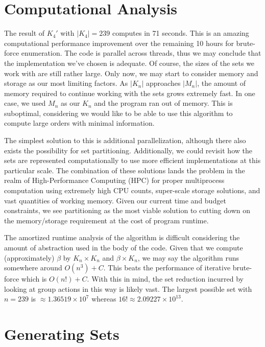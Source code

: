 \documentclass[12pt]{report}
\begin{document}
\section{Computational Analysis}

\par The result of ${K_4}\prime$ with $\left|K_4\right|=239$ computes
in 71 seconds. This is an amazing computational performance improvement over the remaining 10 hours for
brute-force enumeration. The code is parallel across threads, thus we may conclude that the
implementation we've chosen is adequate. Of course, the sizes of the sets we work with are still
rather large. Only now, we may start to consider memory and storage as our most limiting factors. As
$\left|K_n\right|$ approaches $\left|M_n\right|$, the amount of memory required to continue working
with the sets grows extremely fast. In one case, we used $M_n$ as our $K_n$ and the program ran out
of memory. This is suboptimal, considering we would like to be able to use this algorithm to compute large orders with minimal information.

\par The simplest solution to this is additional parallelization, although there also exists the
possibility for set partitioning. Additionally, we could revisit how the sets are represented
computationally to use more efficient implementations at this particular scale.
The combination of these solutions lands the problem in the realm
of High-Performance Computing (HPC) for proper multiprocess computation using extremely high CPU
counts, super-scale storage solutions, and vast quantities of working memory. Given our current
time and budget constraints, we see partitioning as the most viable solution to cutting down on the
memory/storage requirement at the cost of program runtime.

\par The amortized runtime analysis of the algorithm is difficult considering the amount of
abstraction used in the body of the code. Given that we compute (approximately) $\beta$ by $K_n \times K_n$ and $\beta
  \times K_n$, we may say the algorithm runs somewhere around $O\left(n^3\right)+C$. This beats the
performance of iterative brute-force which is $O\left(n!\right)+C$. With this in mind, the set
reduction incurred by looking at group actions in this way is likely vast. The largest possible set
with $n=239$ is $\approx 1.36519 \times 10^7$ whereas $16!\approx 2.09227 \times 10^{13}$.

\section{Generating Sets}
\end{document}
